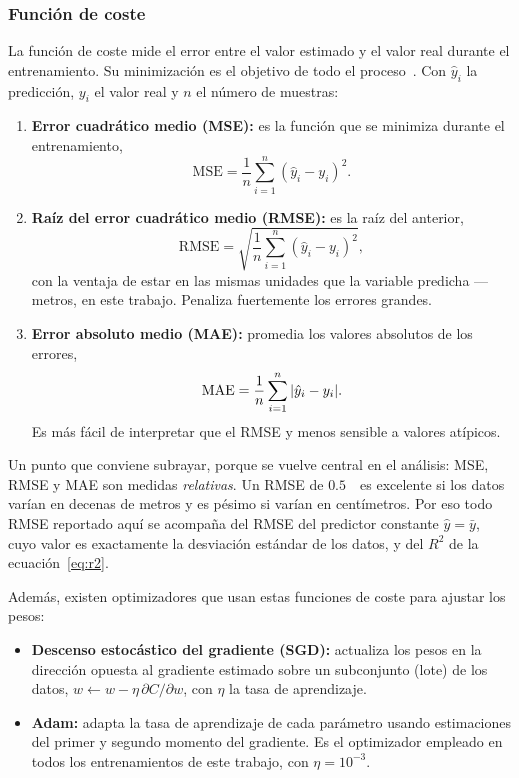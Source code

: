 \documentclass[titlepage,11pt]{article}
\providecommand{\num}[1]{\ensuremath{#1}}
\begin{document}
\subsubsection{Función de coste}
\label{subsubsec:coste}
La función de coste mide el error entre el valor estimado y el valor real
durante el entrenamiento. Su minimización es el objetivo de todo el
proceso~\cite{antonio_2023_introduccin,ibm_qu}. Con $\hat y_i$ la predicción,
$y_i$ el valor real y $n$ el número de muestras:

\begin{enumerate}
\item \textbf{Error cuadrático medio (MSE):} es la función que se minimiza
  durante el entrenamiento,
  \begin{equation}
    \mathrm{MSE}=\frac{1}{n}\sum_{i=1}^{n}(\hat y_i-y_i)^2.
  \end{equation}

\item \textbf{Raíz del error cuadrático medio (RMSE):} es la raíz del anterior,
  \begin{equation}
    \mathrm{RMSE}=\sqrt{\frac{1}{n}\sum_{i=1}^{n}(\hat y_i-y_i)^2},
  \end{equation}
  con la ventaja de estar en las mismas unidades que la variable predicha ---
  metros, en este trabajo. Penaliza fuertemente los errores grandes.

\item \textbf{Error absoluto medio (MAE):} promedia los valores absolutos de
  los errores,
  \begin{equation}
    \mathrm{MAE}=\frac{1}{n}\sum_{i=1}^{n}\abs{\hat y_i-y_i}.
  \end{equation}
  Es más fácil de interpretar que el RMSE y menos sensible a valores atípicos.
\end{enumerate}

Un punto que conviene subrayar, porque se vuelve central en el análisis: MSE,
RMSE y MAE son medidas \emph{relativas}. Un RMSE de \num{0.5}~\meter\ es
excelente si los datos varían en decenas de metros y es pésimo si varían en
centímetros. Por eso todo RMSE reportado aquí se acompaña del RMSE del
predictor constante $\hat y=\bar y$, cuyo valor es exactamente la desviación
estándar de los datos, y del $R^2$ de la ecuación~\eqref{eq:r2}.

Además, existen optimizadores que usan estas funciones de coste para ajustar
los pesos:
\begin{itemize}
\item \textbf{Descenso estocástico del gradiente (SGD):} actualiza los pesos en
  la dirección opuesta al gradiente estimado sobre un subconjunto (lote) de los
  datos, $w \leftarrow w - \eta\,\partial C/\partial w$, con $\eta$ la tasa de
  aprendizaje.
\item \textbf{Adam:} adapta la tasa de aprendizaje de cada parámetro usando
  estimaciones del primer y segundo momento del gradiente. Es el optimizador
  empleado en todos los entrenamientos de este trabajo, con
  $\eta=10^{-3}$.
\end{itemize}
\end{document}
